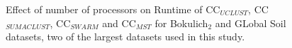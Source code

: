 \documentclass[10pt, conference, compsocconf]{IEEEtran}
\begin{document}
\begin{figure}[t]	
	\begin{minipage}[t]{0.5\linewidth}
	\end{minipage}%
	\hfill%
	\begin{minipage}[t]{0.5\linewidth}
	\end{minipage}	
	\caption{Effect of number of processors on Runtime of CC$_{UCLUST}$, CC$_{SUMACLUST}$, CC$_{SWARM}$ and CC$_{MST}$ for Bokulich$_2$ and GLobal Soil datasets, two of the largest datasets used in this study.}
\end{figure}
\end{document}
